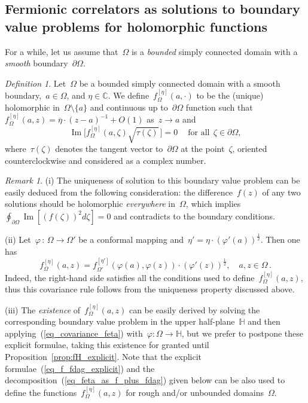 \documentclass[reqno,11pt,a4paper]{amsart}
\theoremstyle{remark}
\newtheorem{definition}[proposition]{Definition}
\newtheorem{remark}[proposition]{Remark}
\renewcommand{\H}{\mathbb{H}}
\newcommand{\feta}{f_{\Omega}^{[\eta]}}
\newcommand{\fetaprime}{f_{\Omega'}^{[\eta']}}
\renewcommand\Im{\operatorname{Im}}
\begin{document}
\subsection{Fermionic correlators as solutions to boundary value problems for holomorphic functions} \label{sub:fermions-via-bvp}

For a while, let us assume that~$\Omega$ is a \emph{bounded} simply connected domain with a \emph{smooth} boundary~$\partial\Omega$.

\begin{definition}\label{def:feta}
Let~$\Omega$ be a bounded simply connected domain with a smooth boundary,~$a\in\Omega$, and $\eta\in \mathbb{C}$.
We define~$\feta(a,\cdot)$ to be the (unique) holomorphic in~$\Omega\setminus\{a\}$ and continuous up to~$\partial\Omega$ function such that
$\feta (a,z) = \overline{\eta}\cdot(z-a)^{-1}+O(1)$ as~$z\to a$ and
\begin{equation}
\label{eq_feta_boundary_conditions}
\Im\big[\feta (a,\zeta)\sqrt{\tau(\zeta)}\,\big]=0~\quad\text{for~all}\ \ \zeta\in\partial \Omega,
\end{equation}
where~$\tau(\zeta)$ denotes the tangent vector to~$\partial\Omega$ at the point~$\zeta$, oriented counterclockwise and considered as a complex number.
\end{definition}

\begin{remark} \label{rem:feta-def}
(i) The uniqueness of solution to this boundary value problem can be easily deduced from the following consideration: the difference~$f(z)$ of any two solutions should be holomorphic \emph{everywhere} in~$\Omega$, which implies~$\oint_{\partial\Omega} \Im[(f(\zeta))^2d\zeta]=0$ and contradicts to the boundary conditions.

\noindent (ii) Let~$\varphi \, : \, \Omega \to \Omega'$ be a conformal mapping and~$\eta' = \eta\cdot (\varphi'(a))^{\frac{1}{2}}$. Then one has
\begin{equation}%
\label{eq_covariance_feta}
\feta (a,z) = \fetaprime (\varphi(a), \varphi(z))\cdot (\varphi'(z))^{\frac{1}{2}},\quad a,z\in\Omega\,.
\end{equation}
Indeed, the right-hand side satisfies all the conditions used to define~$\feta (a,z)$, thus this covariance rule follows from the uniqueness property discussed above.

\noindent (iii) The \emph{existence} of~$\feta(a,z)$ can be easily derived by solving the corresponding boundary value problem in the upper half-plane~$\H$ and then applying~(\ref{eq_covariance_feta}) with~$\varphi:\Omega\to\H$, but we prefer to postpone these explicit formulae, taking this existence for granted until Proposition~\ref{prop:fH_explicit}. Note that the explicit formulae~(\ref{eq_f_fdag_explicit}) and the decomposition~(\ref{eq_feta_as_f_plus_fdag}) given below can be also used to define the functions~$\feta(a,z)$ for rough and/or unbounded domains~$\Omega$.
\end{remark}
\end{document}

